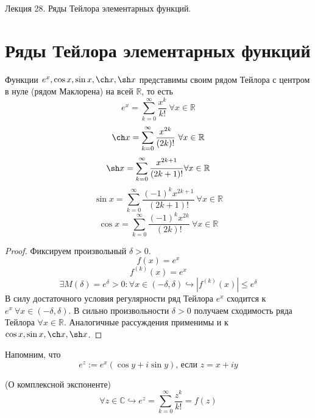 \documentclass[11pt]{article}
\begin{document}
\begin{titlepage}
    \centering
    \vspace*{\fill}  %

    {\Huge Лекция 28. Ряды Тейлора элементарных функций.
    \par}

    \vspace*{\fill}  %
\end{titlepage}

\setcounter{page}{1}

\section{Ряды Тейлора элементарных функций}

\begin{theorem}
    Функции $e^x, \cos x, \sin x, \ch x, \sh x$ представимы своим рядом Тейлора с центром в нуле (рядом Маклорена) на всей $\mathbb{R}$, то есть
    \[ e^x = \sum_{k=0}^{\infty} \frac{x^k}{k!} \ \forall x\in \mathbb{R} \]   
    \[ \ch x = \sum_{k=0}^{\infty} \frac{x^{2k}}{(2k)!} \ \forall x\in \mathbb{R} \]
    \[ \sh x = \sum_{k=0}^{\infty} \frac{x^{2k+1}}{(2k+1)!} \forall x\in \mathbb{R} \]
    \[ \sin x = \sum_{k=0}^{\infty} \frac{(-1)^k x^{2k+1}}{(2k+1)!} \ \forall x\in \mathbb{R} \]   
    \[ \cos x = \sum_{k=0}^{\infty} \frac{(-1)^k x^{2k}}{(2k)!} \ \forall x\in \mathbb{R} \]
\end{theorem}


\begin{proof}
    Фиксируем произвольный $\delta>0$. 
    \[ f(x) = e^x \]
    \[ f^{(k)} (x) = e^x \]  
    \[ \exists M(\delta)= e^\delta > 0: \forall x\in (-\delta,\delta) \hookrightarrow | f^{(k)}(x) | \le e^\delta \]   
    В силу достаточного условия регулярности ряд Тейлора $e^x$ сходится к $e^x \ \forall x\in (-\delta,\delta).$ В сильно произвольности $\delta>0$ получаем сходимость ряда Тейлора $\forall x\in \mathbb{R}$.
    Аналогичные рассуждения применимы и к $ \cos x, \sin x, \ch x, \sh x$.
\end{proof}

\begin{remark}
    Напомним, что 
    \[ e^z := e^x (\cos y+i\sin y) \text{, если  } z= x+iy \]
\end{remark}

\begin{theorem}
    (О комплексной экспоненте) 
    \[ \forall z\in \mathbb{C} \hookrightarrow e^z = \sum_{k=0}^{\infty} \frac{z^k}{k!} = f(z) \]
\end{theorem}
\end{document}
